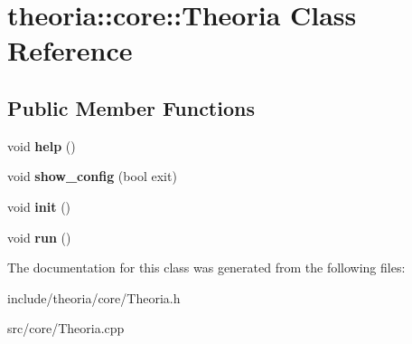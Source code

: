 \hypertarget{classtheoria_1_1core_1_1Theoria}{\section{theoria\+:\+:core\+:\+:Theoria Class Reference}
\label{classtheoria_1_1core_1_1Theoria}
}
\subsection*{Public Member Functions}
\begin{DoxyCompactItemize}
\item 
\hypertarget{classtheoria_1_1core_1_1Theoria_ae8537946e39ac2ec084332edd6ef0a9a}{void {\bfseries help} ()}\label{classtheoria_1_1core_1_1Theoria_ae8537946e39ac2ec084332edd6ef0a9a}

\item 
\hypertarget{classtheoria_1_1core_1_1Theoria_a353a71a3b26b77d814c99756a749bbdf}{void {\bfseries show\+\_\+config} (bool exit)}\label{classtheoria_1_1core_1_1Theoria_a353a71a3b26b77d814c99756a749bbdf}

\item 
\hypertarget{classtheoria_1_1core_1_1Theoria_a7c08abec5d2655e8779f81622406ccb7}{void {\bfseries init} ()}\label{classtheoria_1_1core_1_1Theoria_a7c08abec5d2655e8779f81622406ccb7}

\item 
\hypertarget{classtheoria_1_1core_1_1Theoria_a2792aa50eb3ec9a2bea5288097052a3f}{void {\bfseries run} ()}\label{classtheoria_1_1core_1_1Theoria_a2792aa50eb3ec9a2bea5288097052a3f}

\end{DoxyCompactItemize}


The documentation for this class was generated from the following files\+:\begin{DoxyCompactItemize}
\item 
include/theoria/core/Theoria.\+h\item 
src/core/Theoria.\+cpp\end{DoxyCompactItemize}
